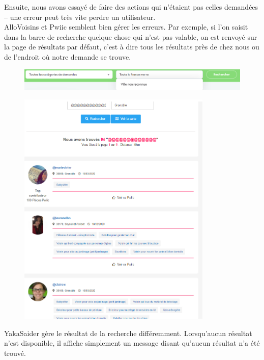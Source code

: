 \documentclass[a4paper,11pt]{article}
\begin{document}
Ensuite, nous avons essayé de faire des actions qui n’étaient pas celles demandées -- une erreur peut très vite perdre un utilisateur.\\

AlloVoisins et Pwiic semblent bien gérer les erreurs. Par exemple, si l’on saisit dans la barre de recherche quelque chose
qui n’est pas valable, on est renvoyé sur la page de résultats par défaut, c’est à dire tous les résultats près de
chez nous ou de l’endroit où notre demande se trouve.\\

\begin{figure}[H]
  \includegraphics[width=\linewidth]{images/gestion-erreur-allovoisins.png}
  \label{fig:gestion-erreur-allovoisins}
\end{figure}

\begin{figure}[H]
  \includegraphics[width=350px]{images/gestion-erreur-yakasaider.png}
  \label{fig:gestion-erreur-yakasaider}
\end{figure}

YakaSaider gère le résultat de la recherche différemment. Lorsqu’aucun résultat n’est disponible,
il affiche simplement un message disant qu’aucun résultat n’a été trouvé.\\
\end{document}
